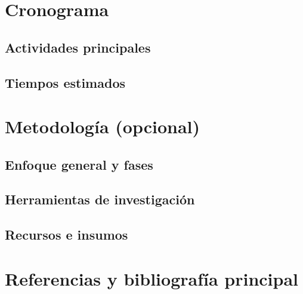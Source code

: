 \section{Cronograma}
\subsection{Actividades principales}
\subsection{Tiempos estimados}

\section{Metodología (opcional)}
\subsection{Enfoque general y fases}
\subsection{Herramientas de investigación}
\subsection{Recursos e insumos}

\section{Referencias y bibliografía principal}

